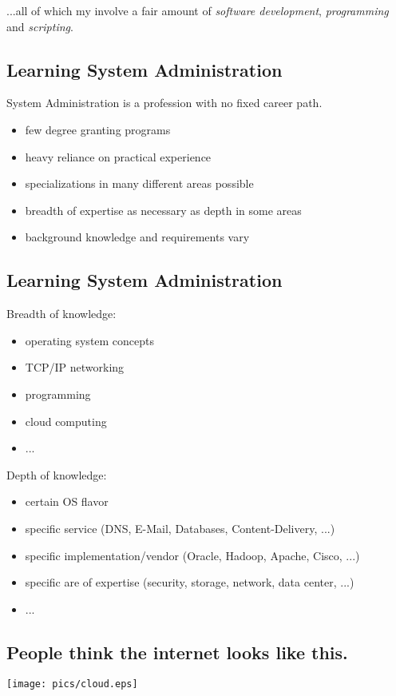 \documentclass[xga]{xdvislides}
\begin{document}
...all of which my involve a fair amount of {\em software development}, {\em
programming} and {\em scripting}.

\subsection{Learning System Administration}
System Administration is a profession with no fixed career path.

\begin{itemize}
	\item few degree granting programs
	\item heavy reliance on practical experience
	\item specializations in many different areas possible
	\item breadth of expertise as necessary as depth in some areas
	\item background knowledge and requirements vary
\end{itemize}

\subsection{Learning System Administration}

Breadth of knowledge:
\begin{itemize}
	\item operating system concepts
	\item TCP/IP networking
	\item programming
	\item cloud computing
	\item ...
\end{itemize}
\vspace{.5in}

Depth of knowledge:
\begin{itemize}
	\item certain OS flavor
	\item specific service (DNS, E-Mail, Databases, Content-Delivery, ...)
	\item specific implementation/vendor (Oracle, Hadoop, Apache, Cisco, ...)
	\item specific are of expertise (security, storage, network, data center, ...)
	\item ...
\end{itemize}

\subsection{People think the internet looks like this.}
\begin{center}
	\texttt{[image: pics/cloud.eps]}
\end{center}
\end{document}
